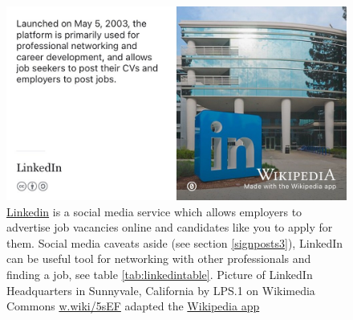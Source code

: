 \documentclass[
]{book}
\begin{document}
\begin{figure}

{\centering \includegraphics[width=0.9\linewidth]{images/linkedin} 

}

\caption{\href{https://en.wikipedia.org/wiki/LinkedIn}{Linkedin} is a social media service which allows employers to advertise job vacancies online and candidates like you to apply for them. Social media caveats aside (see section \ref{signposts3}), LinkedIn can be useful tool for networking with other professionals and finding a job, see table \ref{tab:linkedintable}. Picture of LinkedIn Headquarters in Sunnyvale, California by LPS.1 on Wikimedia Commons \href{https://w.wiki/5sEF}{w.wiki/5sEF} adapted the \href{https://apps.apple.com/us/app/wikipedia/id324715238}{Wikipedia app}}\label{fig:linkedin-fig}
\end{figure}
\end{document}
